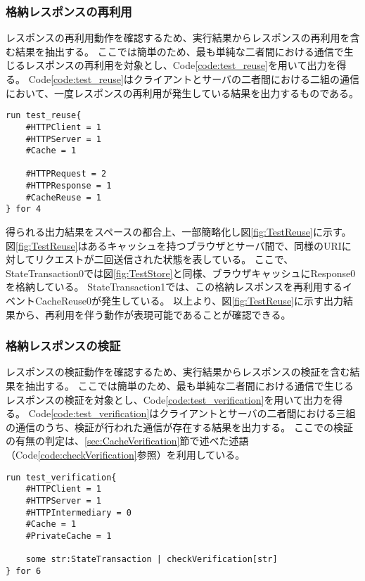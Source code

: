 \documentclass[journal]{IEEEtran}
\begin{document}
\subsubsection{格納レスポンスの再利用}
レスポンスの再利用動作を確認するため、実行結果からレスポンスの再利用を含む結果を抽出する。
ここでは簡単のため、最も単純な二者間における通信で生じるレスポンスの再利用を対象とし、Code\ref{code:test_reuse}を用いて出力を得る。
Code\ref{code:test_reuse}はクライアントとサーバの二者間における二組の通信において、一度レスポンスの再利用が発生している結果を出力するものである。

\begin{lstlisting}[caption=格納レスポンスの再利用, label=code:test_reuse]
run test_reuse{
	#HTTPClient = 1
	#HTTPServer = 1
	#Cache = 1

	#HTTPRequest = 2
	#HTTPResponse = 1
	#CacheReuse = 1
} for 4
\end{lstlisting}

得られる出力結果をスペースの都合上、一部簡略化し図\ref{fig:TestReuse}に示す。
図\ref{fig:TestReuse}はあるキャッシュを持つブラウザとサーバ間で、同様のURIに対してリクエストが二回送信された状態を表している。
ここで、StateTransaction0では図\ref{fig:TestStore}と同様、ブラウザキャッシュにResponse0を格納している。
StateTransaction1では、この格納レスポンスを再利用するイベントCacheReuse0が発生している。
以上より、図\ref{fig:TestReuse}に示す出力結果から、再利用を伴う動作が表現可能であることが確認できる。


\subsubsection{格納レスポンスの検証}
レスポンスの検証動作を確認するため、実行結果からレスポンスの検証を含む結果を抽出する。
ここでは簡単のため、最も単純な二者間における通信で生じるレスポンスの検証を対象とし、Code\ref{code:test_verification}を用いて出力を得る。
Code\ref{code:test_verification}はクライアントとサーバの二者間における三組の通信のうち、検証が行われた通信が存在する結果を出力する。
ここでの検証の有無の判定は、\ref{sec:CacheVerification}節で述べた述語（Code\ref{code:checkVerification}参照）を利用している。

\begin{lstlisting}[caption=格納レスポンスの検証, label=code:test_verification]
run test_verification{
	#HTTPClient = 1
	#HTTPServer = 1
	#HTTPIntermediary = 0
	#Cache = 1
	#PrivateCache = 1

	some str:StateTransaction | checkVerification[str]
} for 6
\end{lstlisting}
\end{document}
